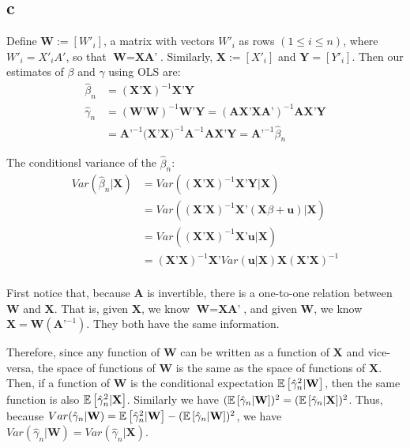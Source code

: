 \documentclass[12pt]{paper}
\begin{document}
\subsection*{c}

Define $\textbf{W}:=[W'_i]$, a matrix with vectors $W'_i$ as rows $(1\le i \le n)$, where $W'_i=X'_iA'$, so that $\textbf{W}=\textbf{XA'}$. Similarly, $\textbf{X}:=[X'_i]$ and $\textbf{Y}=[Y'_i]$. Then our estimates of $\beta$ and $\gamma$ using OLS are:
\begin{equation}
\begin{split}
\hat{\beta}_n&=(\textbf{X'X})^{-1}\textbf{X'Y}\\
\hat{\gamma}_n&=(\textbf{W'W})^{-1}\textbf{W'Y}=(\textbf{AX'XA'})^{-1}\textbf{AX'Y}\\
&=\textbf{A'}^{-1}\textbf{(X'X)}^{-1}\textbf{A}^{-1}\textbf{AX'Y}=\textbf{A'}^{-1}\hat{\beta}_n
\end{split}
\end{equation}

The conditionsl variance of the $\hat{\beta}_n$:
\begin{equation}
\begin{split}
Var(\hat{\beta}_n|\textbf{X})&=Var((\textbf{X'X})^{-1}\textbf{X'Y}|\textbf{X})\\
&=Var((\textbf{X'X})^{-1}\textbf{X'}(\textbf{X}\beta+\textbf{u})|\textbf{X})\\
&=Var((\textbf{X'X})^{-1}\textbf{X'}\textbf{u}|\textbf{X})\\
&=(\textbf{X'X})^{-1}\textbf{X'}Var(\textbf{u}|\textbf{X})\textbf{X}(\textbf{X'X})^{-1}\\
\end{split}
\end{equation}

First notice that, because $\textbf{A}$ is invertible, there is a one-to-one relation between $\textbf{W}$ and $\textbf{X}$. That is, given $\textbf{X}$, we know $\textbf{W}=\textbf{XA'}$, and given $\textbf{W}$, we know $\textbf{X}=\textbf{W}(\textbf{A'}^{-1})$. They both have the same information.

 Therefore, since any function of $\textbf{W}$ can be written as a function of $\textbf{X}$ and vice-versa, the space of functions of $\textbf{W}$ is the same as the space of functions of $\textbf{X}$. Then, if a function of $\textbf{W}$ is the conditional expectation $\mathbb{E} \left [ \hat{\gamma}_n^2|\textbf{W} \right ]$, then the same function is also $\mathbb{E} \left [ \hat{\gamma}_n^2|\textbf{X} \right ]$. Similarly we have $(\mathbb{E} \left [ \hat{\gamma}_n|\textbf{W} \right ])^2=(\mathbb{E} \left [ \hat{\gamma}_n|\textbf{X} \right ])^2$. Thus, because $Var(\hat{\gamma}_n|\textbf{W})=\mathbb{E} \left [ \hat{\gamma}_n^2|\textbf{W} \right ]-(\mathbb{E} \left [ \hat{\gamma}_n|\textbf{W} \right ])^2$,  we have $Var(\hat{\gamma}_n|\textbf{W})=Var(\hat{\gamma}_n|\textbf{X})$.
\end{document}
